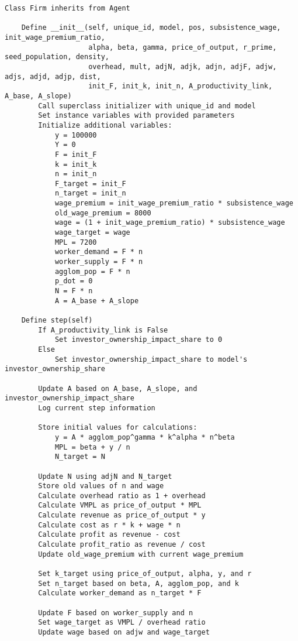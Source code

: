 {\small\begin{verbatim} 
Class Firm inherits from Agent

    Define __init__(self, unique_id, model, pos, subsistence_wage, init_wage_premium_ratio, 
                    alpha, beta, gamma, price_of_output, r_prime, seed_population, density, 
                    overhead, mult, adjN, adjk, adjn, adjF, adjw, adjs, adjd, adjp, dist, 
                    init_F, init_k, init_n, A_productivity_link, A_base, A_slope)
        Call superclass initializer with unique_id and model
        Set instance variables with provided parameters
        Initialize additional variables:
            y = 100000
            Y = 0
            F = init_F
            k = init_k
            n = init_n
            F_target = init_F
            n_target = init_n
            wage_premium = init_wage_premium_ratio * subsistence_wage
            old_wage_premium = 8000
            wage = (1 + init_wage_premium_ratio) * subsistence_wage
            wage_target = wage
            MPL = 7200
            worker_demand = F * n
            worker_supply = F * n
            agglom_pop = F * n
            p_dot = 0
            N = F * n
            A = A_base + A_slope

    Define step(self)
        If A_productivity_link is False
            Set investor_ownership_impact_share to 0
        Else
            Set investor_ownership_impact_share to model's investor_ownership_share
        
        Update A based on A_base, A_slope, and investor_ownership_impact_share
        Log current step information
        
        Store initial values for calculations:
            y = A * agglom_pop^gamma * k^alpha * n^beta
            MPL = beta + y / n
            N_target = N
        
        Update N using adjN and N_target
        Store old values of n and wage
        Calculate overhead ratio as 1 + overhead
        Calculate VMPL as price_of_output * MPL
        Calculate revenue as price_of_output * y
        Calculate cost as r * k + wage * n
        Calculate profit as revenue - cost
        Calculate profit_ratio as revenue / cost
        Update old_wage_premium with current wage_premium
        
        Set k_target using price_of_output, alpha, y, and r
        Set n_target based on beta, A, agglom_pop, and k
        Calculate worker_demand as n_target * F
        
        Update F based on worker_supply and n
        Set wage_target as VMPL / overhead ratio
        Update wage based on adjw and wage_target
        

\end{verbatim}}
